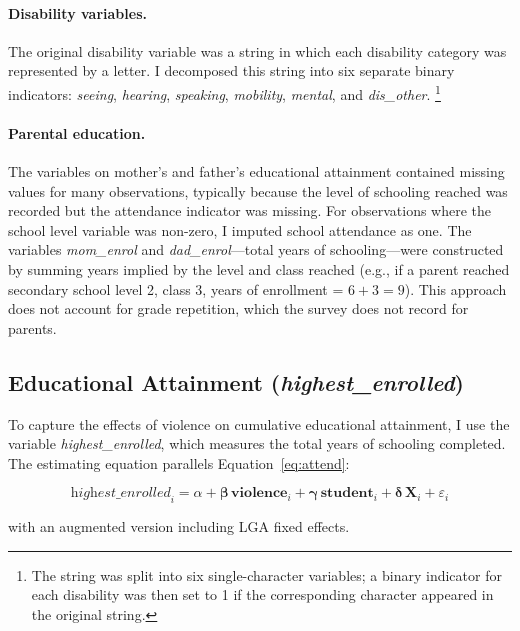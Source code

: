 \paragraph{Disability variables.}
The original disability variable was a string in which each disability
category was represented by a letter. I decomposed this string into six
separate binary indicators: \textit{seeing}, \textit{hearing},
\textit{speaking}, \textit{mobility}, \textit{mental}, and
\textit{dis\_other}.%
\footnote{The string was split into six single-character variables; a binary
indicator for each disability was then set to 1 if the corresponding
character appeared in the original string.}

\paragraph{Parental education.}
The variables on mother's and father's educational attainment contained
missing values for many observations, typically because the level of
schooling reached was recorded but the attendance indicator was missing. For
observations where the school level variable was non-zero, I imputed school
attendance as one. The variables \textit{mom\_enrol} and
\textit{dad\_enrol}---total years of schooling---were constructed by summing
years implied by the level and class reached (e.g., if a parent reached
secondary school level 2, class 3, years of enrollment = $6 + 3 = 9$). This
approach does not account for grade repetition, which the survey does not
record for parents.

\subsection{Educational Attainment (\textit{highest\_enrolled})}
\label{sec:method_attainment}

To capture the effects of violence on cumulative educational attainment, I
use the variable \textit{highest\_enrolled}, which measures the total years
of schooling completed. The estimating equation parallels
Equation~\eqref{eq:attend}:

\begin{equation}
    \label{eq:attainment}
    \textit{highest\_enrolled}_{i} = \alpha
        + \boldsymbol{\beta}\,\mathbf{violence}_{i}
        + \boldsymbol{\gamma}\,\mathbf{student}_{i}
        + \boldsymbol{\delta}\,\mathbf{X}_{i}
        + \varepsilon_{i}
\end{equation}

\noindent with an augmented version including LGA fixed effects.

